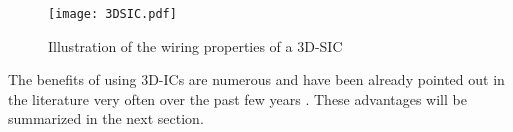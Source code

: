 \begin{figure}[h!]
\begin{center}
\texttt{[image: 3DSIC.pdf]}
\end{center}
\vspace{-0.5cm}
\caption{Illustration of the wiring properties of a 3D-SIC}
\label{fig:3D_SIC_SOC2010}
\end{figure}

The benefits of using 3D-ICs are numerous and have been already pointed out in the literature very often over the past few years \cite{659500}. These advantages will be summarized in the next section.



